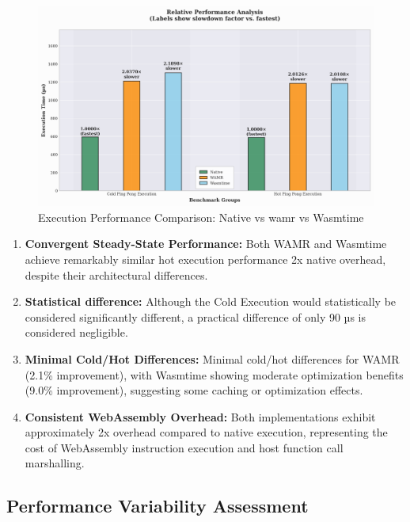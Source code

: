 \begin{figure}[h]
    \centering
    \includegraphics[width=1.0\textwidth]{images/wasm-execution-relative}
    \caption{Execution Performance Comparison: Native vs \acrshort{wamr} vs Wasmtime}
    \label{fig:wasm-execution-relative}
\end{figure}

\begin{enumerate}
    \item \textbf{Convergent Steady-State Performance:} Both WAMR and Wasmtime achieve remarkably similar hot execution performance 2x native overhead, despite their architectural differences.

    \item \textbf{Statistical difference:} Although the Cold Execution would statistically be considered significantly different, a practical difference of only 90 µs is considered negligible.
    
    \item \textbf{Minimal Cold/Hot Differences:} Minimal cold/hot differences for WAMR (2.1\% improvement), with Wasmtime showing moderate optimization benefits (9.0\% improvement), suggesting some caching or optimization effects.
    
    \item \textbf{Consistent WebAssembly Overhead:} Both implementations exhibit approximately 2x overhead compared to native execution, representing the cost of WebAssembly instruction execution and host function call marshalling.
\end{enumerate}

\subsection{Performance Variability Assessment}
\label{subsec:eval-execution-variability}

